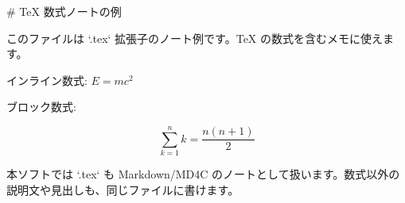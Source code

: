 # TeX 数式ノートの例

このファイルは `.tex` 拡張子のノート例です。TeX の数式を含むメモに使えます。

インライン数式: \(E = mc^2\)

ブロック数式:

$$
\sum_{k=1}^{n} k = \frac{n(n+1)}{2}
$$

本ソフトでは `.tex` も Markdown/MD4C のノートとして扱います。数式以外の説明文や見出しも、同じファイルに書けます。
